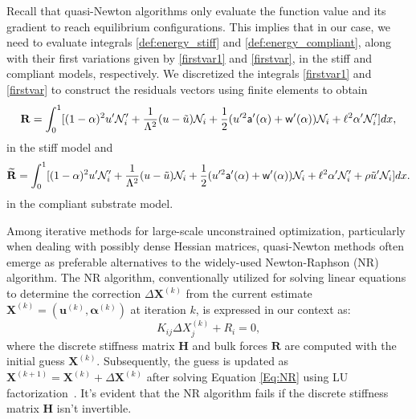 \documentclass[10pt]{article}
\begin{document}
Recall that quasi-Newton algorithms only evaluate the function value and its gradient to reach equilibrium configurations. This implies that in our case, we need to evaluate integrals \eqref{def:energy_stiff} and \eqref{def:energy_compliant}, along with their first variations given by \eqref{firstvar1} and \eqref{firstvar}, in the stiff and compliant models, respectively. We   discretized the integrals \eqref{firstvar1} and \eqref{firstvar} to construct the residuals vectors using finite elements to obtain 
\begin{equation}
    {\bf R} =
     \int_0^1 [(1-\alpha)^2u'\mathcal{N}'_i+\frac{1}{\Lambda^2} (u-\tilde u) \mathcal{N}_i+\frac{1}{2}(u'^2 \mathsf{a}'(\alpha)+\mathsf{w}'(\alpha))\mathcal{N}_i+\ell^2\alpha'\mathcal{N}'_i ]dx,\label{residual1}
\end{equation}
in the stiff model and 
\begin{equation}
    \widetilde{{\bf R}}= 
    \int_0^1 [(1-\alpha)^2u'\mathcal{N}'_i+\frac{1}{\Lambda^2} (u-\tilde u) \mathcal{N}_i+\frac{1}{2}(u'^2 \mathsf{a}'(\alpha)+\mathsf{w}'(\alpha))\mathcal{N}_i+\ell^2\alpha'\mathcal{N}'_i +
    \rho \tilde u'\mathcal{N}_i]dx\label{residual2}.
\end{equation}
in the compliant substrate model. 

Among iterative methods for large-scale unconstrained optimization, particularly when dealing with possibly dense Hessian matrices,  quasi-Newton methods often emerge as preferable alternatives to the widely-used Newton-Raphson (NR) algorithm. The NR algorithm, conventionally utilized for solving linear equations to determine the correction $\Delta \mathbf{X}^{(k)}$ from the current estimate $\mathbf{X}^{(k)} = (\mathbf{u}^{(k)}, \boldsymbol{\alpha}^{(k)})$ at iteration $k$, is expressed in our context as:
\begin{equation}
K_{ij} \Delta X_j^{(k)} + R_i = 0,
\label{Eq:NR}
\end{equation}
where the discrete stiffness matrix $\mathbf{H}$ and bulk forces $\mathbf{R}$ are computed with the initial guess $\mathbf{X}^{(k)}$. Subsequently, the guess is updated as $\mathbf{X}^{(k+1)} = \mathbf{X}^{(k)} + \Delta \mathbf{X}^{(k)}$ after solving Equation \eqref{Eq:NR} using LU factorization~\cite{Sanderson2016-ht}. It's evident that the NR algorithm fails if the discrete stiffness matrix $\mathbf{H}$ isn't invertible.
\end{document}
